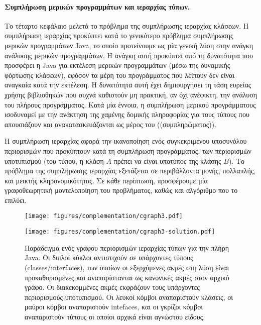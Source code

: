 \paragraph*{Συμπλήρωση μερικών προγραμμάτων και ιεραρχίας τύπων.}
Το τέταρτο κεφάλαιο μελετά το πρόβλημα της συμπλήρωσης ιεραρχίας
κλάσεων. Η συμπλήρωση ιεραρχίας προκύπτει κατά το γενικότερο πρόβλημα
συμπλήρωσης μερικών προγραμμάτων {\en Java}, το οποίο προτείνουμε ως
μία γενική λύση στην ανάγκη ανάλυσης μερικών προγραμμάτων. Η ανάγκη
αυτή προκύπτει από τη δυνατότητα που προσφέρει η {\en Java} για
εκτέλεση μερικών προγραμμάτων (μέσω της δυναμικής φόρτωσης κλάσεων),
εφόσον τα μέρη του προγράμματος που λείπουν δεν είναι αναγκαία κατά
την εκτέλεση. Η δυνατότητα αυτή έχει δημιουργήσει τη τάση ευρείας
χρήσης βιβλιοθηκών που συχνά καθιστούν μη πρακτική, αν όχι ανέφικτη,
την ανάλυση του πλήρους προγράμματος. Κατά μία έννοια, η συμπλήρωση
μερικού προγράμματους ισοδυναμεί με την ανάκτηση της χαμένης δομικής
πληροφορίας για τους τύπους που απουσιάζουν και ανακατασκευάζονται ως
μέρος του ((συμπληρώματος)).

Η συμπλήρωση ιεραρχίας αφορά την ικανοποίηση ενός συγκεκριμένου
υποσυνόλου περιορισμών που προκύπτουν κατά τη συμπλήρωση προγράμματος:
των περιορισμών υποτυπισμού (του τύπου, η κλάση \(A\) πρέπει να είναι
υποτύπος της κλάσης \(B\)). Το πρόβλημα της συμπλήρωσης ιεραρχίας
εξετάζεται σε περιβάλλοντα μονής, πολλαπλής, και μεικτής
κληρονομικότητας. Σε κάθε περίπτωση, προσφέρουμε μία γραφοθεωρητική
μοντελοποίηση του προβλήματος, καθώς και αλγόριθμο που το επιλύει.

{\en
\begin{figure}[th]
  \renewcommand\figurename{{\gr Σχήμα}}
  \begin{minipage}[b]{.5\linewidth}
    \centering
    \texttt{[image: figures/complementation/cgraph3.pdf]}
    \label{synopsis/fig:real-example:problem}
  \end{minipage}
  \begin{minipage}[b]{.5\linewidth}
    \centering
    \texttt{[image: figures/complementation/cgraph3-solution.pdf]}
    \label{synopsis/fig:real-example:solution}
  \end{minipage}
  \caption[]{{\gr Παράδειγμα ενός γράφου περιορισμών ιεραρχίας τύπων
      για την πλήρη {\en Java}. Οι διπλοί κύκλοι αντιστιχούν σε
      υπάρχοντες τύπους ({\en classes/interfaces}), των οποίων οι
      εξερχόμενες ακμές στη λύση είναι προκαθορισμένες και
      αναπαρίστανται ως κανονικές ακμές στον αρχικό γράφο. Οι
      διακεκομμένες ακμές εκφράζουν τους υπάρχοντες περιορισμούς
      υποτυπισμού. Οι λευκοί κόμβοι αναπαριστούν κλάσεις, οι μαύροι
      κόμβοι αναπαριστούν {\en intefaces}, και οι γκρίζοι κόμβοι
      αναπαριστούν τύπους οι οποίοι αρχικά είναι αγνώστου είδους.}}
  \label{synopsis/fig:real-example}
\end{figure}}

